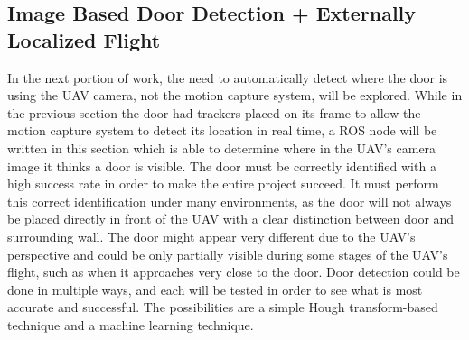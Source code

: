 \documentclass[12pt]{article}
\begin{document}
\subsection{Image Based Door Detection + Externally Localized Flight}
In the next portion of work, the need to automatically detect where the door is using the UAV camera, not the motion capture system, will be explored. While in the previous section the door had trackers placed on its frame to allow the motion capture system to detect its location in real time, a ROS node will be written in this section which is able to determine where in the UAV's camera image it thinks a door is visible. The door must be correctly identified with a high success rate in order to make the entire project succeed. It must perform this correct identification under many environments, as the door will not always be placed directly in front of the UAV with a clear distinction between door and surrounding wall. The door might appear very different due to the UAV's perspective and could be only partially visible during some stages of the UAV's flight, such as when it approaches very close to the door. Door detection could be done in multiple ways, and each will be tested in order to see what is most accurate and successful. The possibilities are a simple Hough transform-based technique and a machine learning technique.
\end{document}
